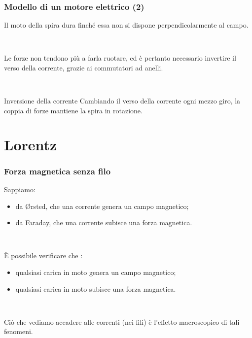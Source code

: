 \documentclass[]{beamer}
\theoremstyle{plain}
\begin{document}
\begin{frame}
\frametitle{Modello di un motore elettrico (2)}
Il moto della spira dura finché essa non si dispone perpendicolarmente al campo.\pause

~

Le forze non tendono più a farla ruotare, ed è pertanto necessario invertire il verso della corrente, grazie ai \alert{commutatori ad anelli}.

~

\begin{center}
\href{video/Motoreelettrico.mp4}{}
\end{center}
\begin{center}
\href{gif/motoreelettrico.gif}{}
\end{center}\pause
\begin{block}{Inversione della corrente}
Cambiando il verso della corrente ogni mezzo giro, la coppia di forze mantiene la spira in rotazione.
\end{block}
\end{frame}




\section{Lorentz}

\begin{frame}
\frametitle{Forza magnetica senza filo}
Sappiamo:
\begin{itemize}
  \item da \O rsted, che \alert<1>{una corrente genera un campo magnetico};\pause
  \item da Faraday, che \alert<2>{una corrente subisce una forza magnetica}.\pause
\end{itemize}

~

È possibile verificare che :
\begin{itemize}
  \item \alert<3>{qualsiasi carica in moto genera un campo magnetico};\pause
  \item \alert<4>{qualsiasi carica in moto subisce una forza magnetica}.\pause
\end{itemize}

~

Ciò che vediamo accadere alle correnti (nei fili) è l'effetto macroscopico di tali fenomeni.
\end{frame}
\end{document}
